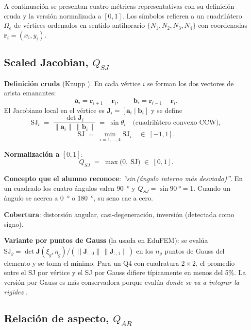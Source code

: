 \documentclass[11pt,a4paper]{article}
\begin{document}
A continuaci\'on se presentan cuatro m\'etricas representativas con su definici\'on cruda y la
versi\'on normalizada a $[0,1]$. Los s\'imbolos refieren a un cuadril\'atero $\Omega_e$ de
v\'ertices ordenados en sentido antihorario $\{N_1,N_2,N_3,N_4\}$ con coordenadas
$\bm{r}_i = (x_i,y_i)$.

\subsection{Scaled Jacobian, $Q_{SJ}$}

\textbf{Definici\'on cruda} (Knupp \cite{Knupp2001,Knupp2000a}). En cada v\'ertice $i$ se forman
los dos vectores de arista emanantes:
\[
  \bm{a}_i = \bm{r}_{i+1}-\bm{r}_i, \qquad \bm{b}_i = \bm{r}_{i-1}-\bm{r}_i.
\]
El Jacobiano local en el v\'ertice es $\bm{J}_i = [\bm{a}_i \mid \bm{b}_i]$ y se define
\[
  \mathrm{SJ}_i \;=\; \frac{\det \bm{J}_i}{\lVert\bm{a}_i\rVert\,\lVert\bm{b}_i\rVert}
  \;=\; \sin\theta_i \quad\text{(cuadril\'atero convexo CCW)},
\]
\[
  \mathrm{SJ} \;=\; \min_{i=1,\dots,4}\mathrm{SJ}_i \quad\in\;[-1,1].
\]

\textbf{Normalizaci\'on a $[0,1]$}:
\begin{equation}\boxed{\;
  Q_{SJ} \;=\; \max\!\bigl(0,\;\mathrm{SJ}\bigr) \;\in\;[0,1].
\;}\label{eq:QSJ}\end{equation}

\textbf{Concepto que el alumno reconoce}: \emph{\textquotedblleft sin\,(\'angulo interno
m\'as desviado)\textquotedblright}. En un cuadrado los cuatro \'angulos valen \SI{90}{\degree} y
$Q_{SJ}=\sin\SI{90}{\degree}=1$. Cuando un \'angulo se acerca a \SI{0}{\degree} o
\SI{180}{\degree}, su seno cae a cero.

\textbf{Cobertura}: distorsi\'on angular, casi-degeneraci\'on, inversi\'on (detectada como signo).

\medskip

\textbf{Variante por puntos de Gauss} (la usada en EduFEM): se eval\'ua
$\mathrm{SJ}_g = \det\bm{J}(\xi_g,\eta_g) / (\lVert\bm{J}_{:,0}\rVert\,\lVert\bm{J}_{:,1}\rVert)$
en los $n_g$ puntos de Gauss del elemento y se toma el m\'inimo. Para un Q4 con cuadratura $2\times2$,
el promedio entre el SJ por v\'ertice y el SJ por Gauss difiere t\'ipicamente en menos del 5\%.
La versi\'on por Gauss es m\'as conservadora porque eval\'ua \emph{donde se va a integrar la rigidez}
\cite{Knupp2000b}.

\subsection{Relaci\'on de aspecto, $Q_{AR}$}
\end{document}
